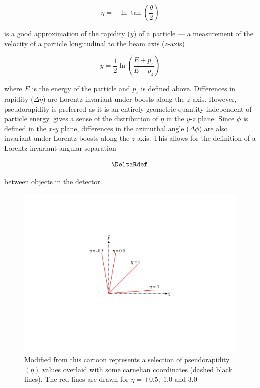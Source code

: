 \begin{equation}
 \eta = -\ln \tan \left( \frac{\theta}{2} \right)
\end{equation}

is a good approximation of the rapidity ($y$) of a particle --- a measurement of
the velocity of a particle longitudinal to the beam axis ($z$-axis)

\begin{equation}
y = \frac{1}{2} \ln \left( \frac{E + p_{z}}{E - p_{z}} \right)
\end{equation}

where $E$ is the energy of the particle and $p_{z}$ is defined above.
Differences in rapidity ($\Delta\eta$) are Lorentz invariant under boosts along
the $z$-axis.  However, pseudorapidity is preferred as it is an entirely
geometric quantity independent of particle energy. 
gives a sense of the distribution of $\eta$ in the $y$-$z$ plane. Since $\phi$
is defined in the $x$-$y$ plane, differences in the azimuthal angle
($\Delta\phi$) are also invariant under Lorentz boosts along the $z$-axis.
This allows for the definition of a Lorentz invariant angular separation

\begin{equation}
 \DeltaRdef \,
\end{equation}

between objects in the detector.

\begin{figure}[!htbp]
  \begin{center}
    \includegraphics[width=0.5\linewidth]{figures/atlas/pseudorapidity}
    \caption{Modified from \cite{Stark:2317296} this cartoon represents a
selection of pseudorapidity $(\eta)$ values overlaid with some carnelian
coordinates (dashed black lines).  The red lines are drawn for $\eta = \pm
0.5, \; 1.0 \text{ and } 3.0$ }
    \label{fig:pseudorapidity}
  \end{center}
\end{figure}

